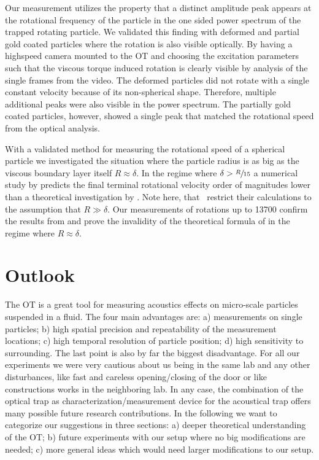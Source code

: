 Our measurement utilizes the property that a distinct amplitude peak appears at 
the rotational frequency of the particle in the one sided power spectrum of the 
trapped rotating particle. We validated this finding with deformed and partial 
gold coated particles where the rotation is also visible optically. By having a 
highspeed camera mounted to the OT and choosing the excitation parameters such 
that the viscous torque induced rotation is clearly visible by analysis of the 
single frames from the video. The deformed particles did not rotate with a 
single constant velocity because of its non-spherical shape. Therefore, 
multiple additional peaks were also visible in the power spectrum. The 
partially gold coated particles, however, showed a single peak that matched the 
rotational speed from the optical analysis.

With a validated method for measuring the rotational speed of a spherical 
particle we investigated the situation where the particle radius is as big as 
the viscous boundary layer itself $R\approx\delta$. In the regime where $\delta 
> \sfrac{R}{15}$ a numerical study by  predicts the final 
terminal rotational velocity order of magnitudes lower than a theoretical 
investigation by . Note here, that~\cite{Lamprecht2015} 
restrict their calculations to the assumption that $R\gg\delta$. Our 
measurements of rotations up to \SI{13700}{\rpm} confirm the results from 
 and prove the invalidity of the theoretical formula of 
 in the regime where $R\approx\delta$.

\section{Outlook}

The OT is a great tool for measuring acoustics effects on micro-scale particles 
suspended in a fluid. The four main advantages are: a) measurements on single 
particles; b) high spatial precision and repeatability of the measurement 
locations; c) high temporal resolution of particle position; d) high 
sensitivity to surrounding. The last point is also by far the biggest 
disadvantage. For all our experiments we were very cautious about us being in 
the same lab and any other disturbances, like fast and careless opening/closing 
of the door or like constructions works in the neighboring lab. In any case, 
the combination of the optical trap as characterization/measurement device for 
the acoustical trap offers many possible future research contributions. In the 
following we want to categorize our suggestions in three sections: a) deeper 
theoretical understanding of the OT; b) future experiments with our setup where 
no big modifications are needed; c) more general ideas which would need larger 
modifications to our setup.

